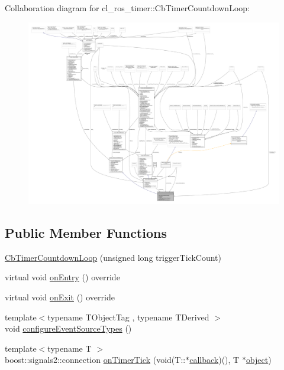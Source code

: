 Collaboration diagram for cl\+\_\+ros\+\_\+timer\+:\+:Cb\+Timer\+Countdown\+Loop\+:
\nopagebreak
\begin{figure}[H]
\begin{center}
\leavevmode
\includegraphics[width=350pt]{classcl__ros__timer_1_1CbTimerCountdownLoop__coll__graph}
\end{center}
\end{figure}
\subsection*{Public Member Functions}
\begin{DoxyCompactItemize}
\item 
\hyperlink{classcl__ros__timer_1_1CbTimerCountdownLoop_a8cdfe250d9469ea019b61051be123195}{Cb\+Timer\+Countdown\+Loop} (unsigned long trigger\+Tick\+Count)
\item 
virtual void \hyperlink{classcl__ros__timer_1_1CbTimerCountdownLoop_aa088f15db4fb2c307c86b30b2e1f7744}{on\+Entry} () override
\item 
virtual void \hyperlink{classcl__ros__timer_1_1CbTimerCountdownLoop_a5623e9fdd8f0fb23e8707f7816c099d6}{on\+Exit} () override
\item 
{\footnotesize template$<$typename T\+Object\+Tag , typename T\+Derived $>$ }\\void \hyperlink{classcl__ros__timer_1_1CbTimerCountdownLoop_a8672075f8a3cbf4ef3f50af0eed8fa53}{configure\+Event\+Source\+Types} ()
\item 
{\footnotesize template$<$typename T $>$ }\\boost\+::signals2\+::connection \hyperlink{classcl__ros__timer_1_1CbTimerCountdownLoop_ad251cc8444ca7070f64658bbb77e1275}{on\+Timer\+Tick} (void(T\+::$\ast$\hyperlink{3_2servers_2opencv__perception__node_2opencv__perception__node_8cpp_a050e697bd654facce10ea3f6549669b3}{callback})(), T $\ast$\hyperlink{classobject}{object})
\end{DoxyCompactItemize}
